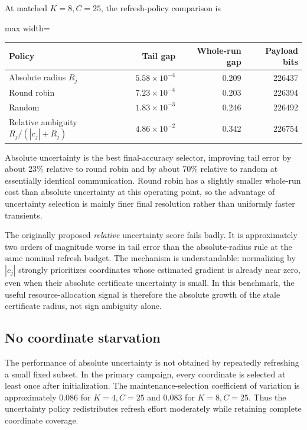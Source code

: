 At matched $K=8,C=25$, the refresh-policy comparison is
\begin{center}
\begin{adjustbox}{max width=\textwidth}
\begin{tabular}{lrrr}
\toprule
Policy & Tail gap & Whole-run gap & Payload bits \\
\midrule
Absolute radius $R_j$ & $5.58\times10^{-4}$ & 0.209 & 226437 \\
Round robin & $7.23\times10^{-4}$ & 0.203 & 226394 \\
Random & $1.83\times10^{-3}$ & 0.246 & 226492 \\
Relative ambiguity $R_j/(|c_j|+R_j)$ & $4.86\times10^{-2}$ & 0.342 & 226754 \\
\bottomrule
\end{tabular}
\end{adjustbox}
\end{center}
Absolute uncertainty is the best final-accuracy selector, improving tail error by about 23\% relative to round robin and by about 70\% relative to random at essentially identical communication. Round robin has a slightly smaller whole-run cost than absolute uncertainty at this operating point, so the advantage of uncertainty selection is mainly finer final resolution rather than uniformly faster transients.

The originally proposed \emph{relative} uncertainty score fails badly. It is approximately two orders of magnitude worse in tail error than the absolute-radius rule at the same nominal refresh budget. The mechanism is understandable: normalizing by $|c_j|$ strongly prioritizes coordinates whose estimated gradient is already near zero, even when their absolute certificate uncertainty is small. In this benchmark, the useful resource-allocation signal is therefore the absolute growth of the stale certificate radius, not sign ambiguity alone.

\subsection{No coordinate starvation}

The performance of absolute uncertainty is not obtained by repeatedly refreshing a small fixed subset. In the primary campaign, every coordinate is selected at least once after initialization. The maintenance-selection coefficient of variation is approximately 0.086 for $K=4,C=25$ and 0.083 for $K=8,C=25$. Thus the uncertainty policy redistributes refresh effort moderately while retaining complete coordinate coverage.

